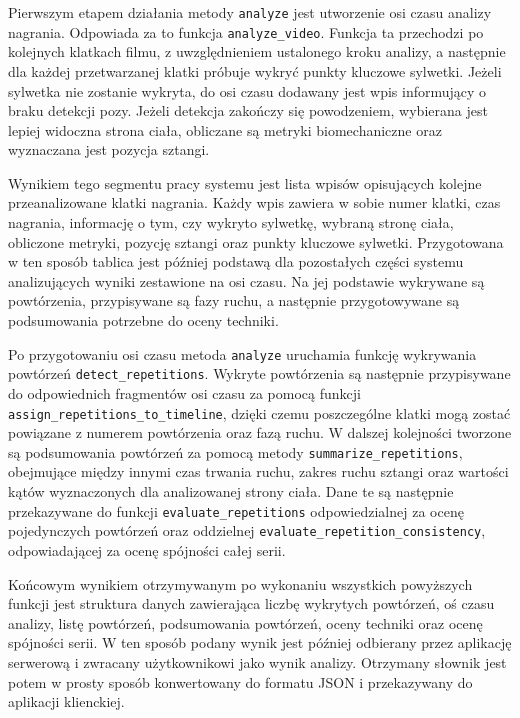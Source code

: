 Pierwszym etapem działania metody \texttt{analyze} jest utworzenie osi czasu analizy nagrania. Odpowiada za to funkcja \texttt{analyze\_video}. Funkcja ta przechodzi po kolejnych klatkach filmu, z uwzględnieniem ustalonego kroku analizy, a następnie dla każdej przetwarzanej klatki próbuje wykryć punkty kluczowe sylwetki. Jeżeli sylwetka nie zostanie wykryta, do osi czasu dodawany jest wpis informujący o braku detekcji pozy. Jeżeli detekcja zakończy się powodzeniem, wybierana jest lepiej widoczna strona ciała, obliczane są metryki biomechaniczne oraz wyznaczana jest pozycja sztangi.

Wynikiem tego segmentu pracy systemu jest lista wpisów opisujących kolejne przeanalizowane klatki nagrania. Każdy wpis zawiera w sobie numer klatki, czas nagrania, informację o tym, czy wykryto sylwetkę, wybraną stronę ciała, obliczone metryki, pozycję sztangi oraz punkty kluczowe sylwetki. Przygotowana w ten sposób tablica jest później podstawą dla pozostałych części systemu analizujących wyniki zestawione na osi czasu. Na jej podstawie wykrywane są powtórzenia, przypisywane są fazy ruchu, a następnie przygotowywane są podsumowania potrzebne do oceny techniki.

Po przygotowaniu osi czasu metoda \texttt{analyze} uruchamia funkcję wykrywania powtórzeń \texttt{detect\_repetitions}. Wykryte powtórzenia są następnie przypisywane do odpowiednich fragmentów osi czasu za pomocą funkcji \texttt{assign\_repetitions\_to\_timeline}, dzięki czemu poszczególne klatki mogą zostać powiązane z numerem powtórzenia oraz fazą ruchu. W dalszej kolejności tworzone są podsumowania powtórzeń za pomocą metody \texttt{summarize\_repetitions}, obejmujące między innymi czas trwania ruchu, zakres ruchu sztangi oraz wartości kątów wyznaczonych dla analizowanej strony ciała. Dane te są następnie przekazywane do funkcji \texttt{evaluate\_repetitions} odpowiedzialnej za ocenę pojedynczych powtórzeń oraz oddzielnej \texttt{evaluate\_repetition\_consistency}, odpowiadającej za ocenę spójności całej serii.

Końcowym wynikiem otrzymywanym po wykonaniu wszystkich powyższych funkcji jest struktura danych zawierająca liczbę wykrytych powtórzeń, oś czasu analizy, listę powtórzeń, podsumowania powtórzeń, oceny techniki oraz ocenę spójności serii. W ten sposób podany wynik jest później odbierany przez aplikację serwerową i zwracany użytkownikowi jako wynik analizy. Otrzymany słownik jest potem w prosty sposób konwertowany do formatu JSON i przekazywany do aplikacji klienckiej.

